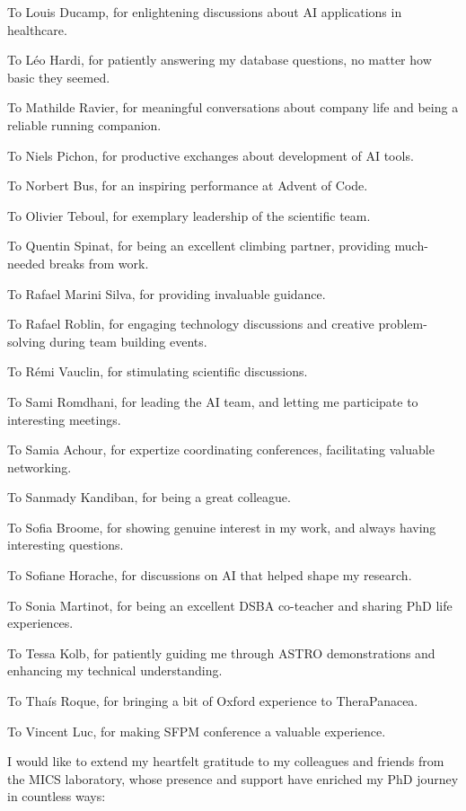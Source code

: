 To Louis Ducamp, for enlightening discussions about AI applications in healthcare.

To Léo Hardi, for patiently answering my database questions, no matter how basic they seemed.

To Mathilde Ravier, for meaningful conversations about company life and being a reliable running companion.

To Niels Pichon, for productive exchanges about development of AI tools.

To Norbert Bus, for an inspiring performance at Advent of Code.

To Olivier Teboul, for exemplary leadership of the scientific team.

To Quentin Spinat, for being an excellent climbing partner, providing much-needed breaks from work.

To Rafael Marini Silva, for providing invaluable guidance.

To Rafael Roblin, for engaging technology discussions and creative problem-solving during team building events.

To Rémi Vauclin, for stimulating scientific discussions.

To Sami Romdhani, for leading the AI team, and letting me participate to interesting meetings.

To Samia Achour, for expertize coordinating conferences, facilitating valuable networking.

To Sanmady Kandiban, for being a great colleague.

To Sofia Broome, for showing genuine interest in my work, and always having interesting questions.

To Sofiane Horache, for discussions on AI that helped shape my research.

To Sonia Martinot, for being an excellent DSBA co-teacher and sharing PhD life experiences.

To Tessa Kolb, for patiently guiding me through ASTRO demonstrations and enhancing my technical understanding.

To Thaís Roque, for bringing a bit of Oxford experience to TheraPanacea.

To Vincent Luc, for making SFPM conference a valuable experience.



I would like to extend my heartfelt gratitude to my colleagues and friends from the MICS laboratory, whose presence and support have enriched my PhD journey in countless ways:

